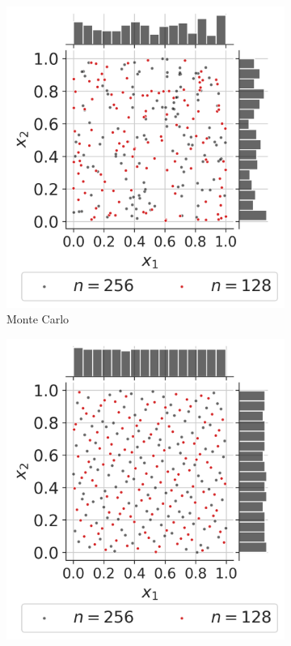 \begin{figure}[ht]
    \centering
    \begin{subfigure}[b]{0.32\textwidth}
        \centering
        \includegraphics[width=\textwidth]{../numerical_experiments/chapter1/figures/MonteCarlo256.png}
        \caption{Monte Carlo}
    \end{subfigure}
    \hfill
    \begin{subfigure}[b]{0.32\textwidth}
        \centering
        \includegraphics[width=\textwidth]{../numerical_experiments/chapter1/figures/quasi_MonteCarlo_Halton_256.png}

\end{subfigure}
\end{figure}
